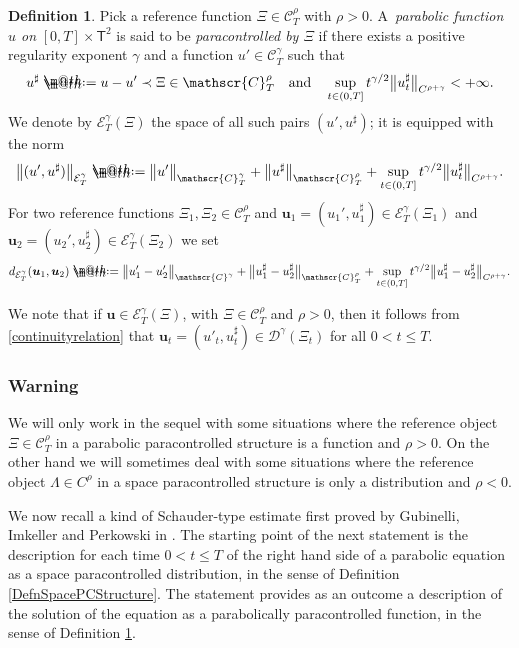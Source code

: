 \documentclass[10pt]{amsart}
\makeatletter
\theoremstyle{definition}
\newtheorem{defn}[thm]{Definition}
\newcommand{\bsfT}{\mathbf{\mathsf{T}}}
\newcommand{\mcD}{\mathcal{D}}
\newcommand{\mcE}{\mathcal{E}}
\newcommand{\bsu}{\boldsymbol{u}}
\newcommand{\scrC}{\ensuremath{\mathscr{C}}}
\newcommand*{\defeq}{\mathrel{\rlap{%
\raisebox{0.3ex}{$\m@th\cdot$}}%
\raisebox{-0.3ex}{$\m@th\cdot$}}%
=}
\makeatother
\begin{document}
\begin{defn} \label{DefnParabolicPCStructure}
Pick a reference function $\Xi\in\scrC_T^\rho$ with $\rho>0$. A~\emph{parabolic function $u$ on} \emph{$[0,T]\times\bsfT^2$} is said to be \emph{paracontrolled by $\Xi$} if there exists a positive regularity exponent $\gamma$ and a function $u'\in\scrC^\gamma_T$ such that\vspace*{-3pt}
\[
u^\sharp \defeq u-u'\prec \Xi \in \scrC_T^\rho
\quad
\text{and}
\quad
\sup_{t\in(0,T]}t^{\gamma/2}\big\Vert u^\sharp_t\big\Vert_{C^{\rho+\gamma}} < +\infty.
\]
We denote by $\mcE_T^{\gamma}(\Xi)$ the space of all such pairs $(u',u^\sharp)$; it is equipped with the norm\vspace*{-3pt}
\[
\big\Vert(u',u^\sharp)\big\Vert_{\mcE^{\gamma}_T} \defeq \big\Vert u'\big\Vert_{\scrC_T^\gamma} + \big\Vert u^\sharp\big\Vert_{\scrC_T^\rho} + \sup_{t\in(0,T]}t^{\gamma/2}\big\Vert u^\sharp_t\big\Vert_{C^{\rho+\gamma}}.
\]
For two reference functions $\Xi_1, \Xi_2\in\scrC^\rho_T$ and $\bsu_1=(u_1',u_1^\sharp)\in\mcE^{\gamma}_T(\Xi_1)$ and $\bsu_2 =(u_2',u_2^\sharp)\in\mcE^{\gamma}_T(\Xi_2)$ we set
\[
d_{\mcE^{\gamma}_T}(\bsu_1,\bsu_2) \defeq \big\Vert u_1'-u_2'\big\Vert_{\scrC^\gamma} + \big\Vert u_1^\sharp-u_2^\sharp \big\Vert_{\scrC^\rho_T} + \sup_{t\in(0,T]}t^{\gamma/2}\big\Vert u_1^\sharp-u_2^\sharp\big\Vert_{C^{\rho+\gamma}}.
\]
\end{defn}

We note that if $\bsu\in\mcE^\gamma_T(\Xi)$, with $\Xi\in\scrC^\rho_T$ and $\rho>0$, then it follows from \eqref{continuityrelation} that $\bsu_t=(u'_t,u^\sharp_t) \in \mcD^\gamma(\Xi_t)$ for all $0<t\leq T$.

\subsubsection*{Warning}
We will only work in the sequel with some situations where the reference object $\Xi\in\scrC_T^\rho$ in a parabolic paracontrolled structure is a function and $\rho>0$. On the other hand we will sometimes deal with some situations where the reference object $\Lambda\in C^\rho$ in a space paracontrolled structure is only a distribution and $\rho<0$.

\medskip
We now recall a kind of Schauder-type estimate first proved by Gubinelli, Imkeller and Perkowski in \cite[\S5]{GIP}. The starting point of the next statement is the description for each time $0<t\leq T$ of the right hand side of a parabolic equation as a space paracontrolled distribution, in the sense of Definition \ref{DefnSpacePCStructure}. The statement provides as an outcome a description of the solution of the equation as a parabolically paracontrolled function, in the sense of Definition \ref{DefnParabolicPCStructure}.
\end{document}
